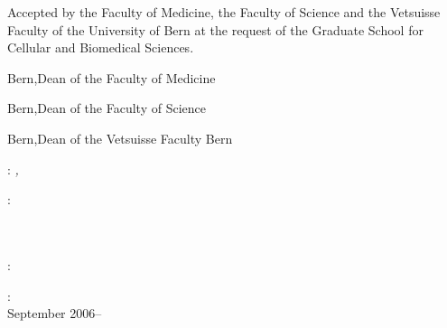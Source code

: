 \thispagestyle{empty}
\noindent Accepted by the Faculty of Medicine, the Faculty of Science and the Vetsuisse Faculty of the University of Bern at the request of the Graduate School for Cellular and Biomedical Sciences.

\vspace{2.5cm}
\noindent Bern,\hfill Dean of the Faculty of Medicine

\vspace{2.5cm}
\noindent Bern,\hfill Dean of the Faculty of Science

\vspace{2.5cm}
\noindent Bern,\hfill Dean of the Vetsuisse Faculty Bern\\
\vfill

\noindent\myName: \emph{\myTitle,} \myDegree

\bigskip
\noindent{}:\\
\myProf \\
\myOtherProf \\ 
\mySupervisor

\medskip

\noindent{}:\\
\noindent\myLocation

\medskip
\noindent{}:\\
September 2006--\myTime
